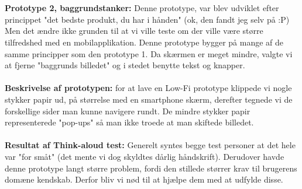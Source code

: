 \\\\ \textbf{Prototype 2, baggrundstanker:} Denne prototype, var blev udviklet efter princippet "det bedste produkt, du har i hånden" (ok, den fandt jeg selv på :P) Men det ændre ikke  grunden til at vi ville teste om der ville være større tilfredshed med en mobilapplikation.
Denne prototype bygger på mange af de samme principper som den prototype 1. Da skærmen er meget mindre, valgte vi at fjerne "baggrunds billedet" og i stedet benytte tekst og knapper.\\\\ \textbf{Beskrivelse af prototypen:} for at lave en Low-Fi prototype klippede vi nogle stykker papir ud, på størrelse med en smartphone skærm, derefter tegnede vi de forskellige sider man kunne navigere rundt. De mindre stykker papir representerede "pop-ups" så man ikke troede at man skiftede billedet.\\\\ \textbf{Resultat af Think-aloud test:} Generelt syntes begge test personer at det hele var "for småt" (det mente vi dog skyldtes dårlig håndskrift). Derudover havde denne prototype langt større problem, fordi den stillede størrer krav til brugerens domæne kendskab. Derfor bliv vi nød til at hjælpe dem med at udfylde disse.

